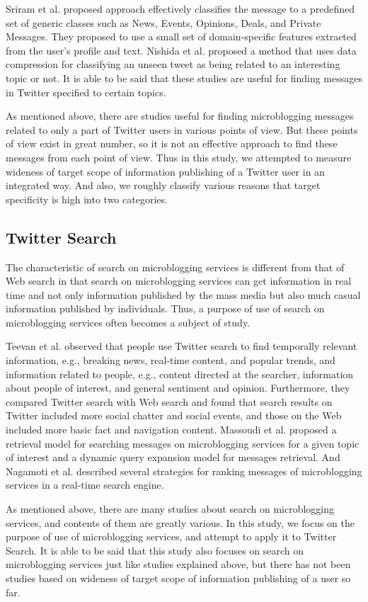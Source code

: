 Sriram et al.\cite{sriram2010short} proposed approach effectively
classifies the message to a predefined set of generic classes such as
News, Events, Opinions, Deals, and Private Messages.  They proposed to
use a small set of domain-specific features extracted from the user's
profile and text.  Nishida et al.\cite{nishida2011tweet} proposed a
method that uses data compression for classifying an unseen tweet as
being related to an interesting topic or not.  It is able to be
said that these studies are useful for finding messages in Twitter
specified to certain topics.

As mentioned above, there are studies useful for finding microblogging
messages related to only a part of Twitter users in various points of
view.  But these points of view exist in great number, so it is not an
effective approach to find these messages from each point of view.
Thus in this study, we attempted to measure wideness of target scope of
information publishing of a Twitter user in an integrated way.  And
also, we roughly classify various reasons that target specificity is
high into two categories.

\subsection{Twitter Search}
\label{subsec:Twitter Search}

The characteristic of search on microblogging services is different
from that of Web search\cite{broder2002taxonomy} in that search on
microblogging services can get information in real
time\cite{busch2012earlybird} and not only information published by the
mass media but also much casual information published by
individuals\cite{java2007we}.  Thus, a purpose of use of search on
microblogging services often becomes a subject of study.

Teevan et al.\cite{teevan2011twittersearch} observed that people use
Twitter search to find temporally relevant information, e.g., breaking
news, real-time content, and popular trends, and information related to
people, e.g., content directed at the searcher, information about
people of interest, and general sentiment and opinion.  Furthermore,
they compared Twitter search with Web search and found that search
results on Twitter included more social chatter and social events, and
those on the Web included more basic fact and navigation content.
Massoudi et al.\cite{massoudi2011incorporating} proposed a retrieval
model for searching messages on microblogging services for a given topic
of interest and a dynamic query expansion model for messages retrieval.
And Nagamoti et al.\cite{nagmoti2010ranking} described several
strategies for ranking messages of microblogging services in a
real-time search engine.

As mentioned above, there are many studies about search on microblogging
services, and contents of them are greatly various.  In this study, we
focus on the purpose of use of microblogging services, and attempt to
apply it to Twitter Search.  It is able to be said that this study also
focuses on search on microblogging services just like studies explained
above, but there has not been studies based on wideness of target scope
of information publishing of a user so far.